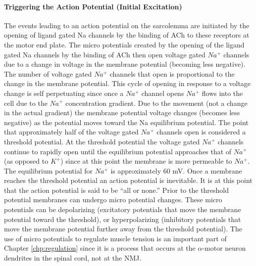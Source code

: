 \paragraph{Triggering the Action Potential (Initial Excitation)}
The events leading to an action potential on the sarcolemma are initiated by the opening of ligand gated Na channels by the binding of ACh to these receptors at the motor end plate. The micro potentials created by the opening of the ligand gated Na channels by the binding of ACh then open voltage gated $Na^+$ channels due to a change in voltage in the membrane potential (becoming less negative). The number of voltage gated $Na^+$ channels that open is proportional to the change in the membrane potential. This cycle of opening in response to a voltage change is self perpetuating since once a $Na^+$ channel opens $Na^+$ flows into the cell due to the $Na^+$ concentration gradient. Due to the movement (not a change in the actual gradient) the membrane potential voltage changes (becomes less negative) as the potential moves toward the Na equilibrium potential. The point that approximately half of the voltage gated $Na^+$ channels open is considered a threshold potential. At the threshold potential the voltage gated $Na^+$ channels continue to rapidly open until the equilibrium potential approaches that of $Na^+$ (as opposed to $K^+$) since at this point the membrane is more permeable to $Na^+$. The equilibrium potential for $Na^+$ is approximately 60 mV.  Once a membrane reaches the threshold potential an action potential is inevitable. It is at this point that the action potential is said to be “all or none.” Prior to the threshold potential membranes can undergo micro potential changes. These micro potentials can be depolarizing (excitatory potentials that move the membrane potential toward the threshold), or hyperpolarizing (inhibitory potentials that move the membrane potential further away from the threshold potential). The use of micro potentials to regulate muscle tension is an important part of Chapter \ref{chp:regulation} since it is a process that occurs at the $\alpha$-motor neuron dendrites in the spinal cord, not at the NMJ.\footnotemark{}

